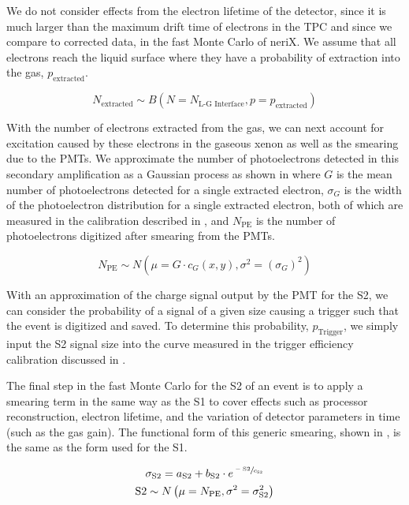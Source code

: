 We do not consider effects from the electron lifetime of the detector, since it is much larger than the maximum drift time of electrons in the TPC and since we compare to corrected data, in the fast Monte Carlo of neriX.  We assume that all electrons reach the liquid surface where they have a probability of extraction into the gas, $p_{\textrm{extracted}}$.


\begin{equation}
        \label{eqn:nerix_binomial_ee}
        N_{\textrm{extracted}} \sim B \left( N= N_{\textrm{L-G Interface}}, p=p_{\textrm{extracted}} \right)
\end{equation}


With the number of electrons extracted from the gas, we can next account for excitation caused by these electrons in the gaseous xenon as well as the smearing due to the PMTs.  We approximate the number of photoelectrons detected in this secondary amplification as a Gaussian process as shown in  where $G$ is the mean number of photoelectrons detected for a single extracted electron, $\sigma_G$ is the width of the photoelectron distribution for a single extracted electron, both of which are measured in the calibration described in , and $N_{\textrm{PE}}$ is the number of photoelectrons digitized after smearing from the PMTs.

\begin{equation}
        \label{eqn:nerix_gas_gain}
        N_{\textrm{PE}} \sim N(\mu=G \cdot c_{G}(x, y), \sigma^2=(\sigma_G)^2)
\end{equation}


With an approximation of the charge signal output by the PMT for the S2, we can consider the probability of a signal of a given size causing a trigger such that the event is digitized and saved.  To determine this probability, $p_{\textrm{Trigger}}$, we simply input the S2 signal size into the curve measured in the trigger efficiency calibration discussed in .

The final step in the fast Monte Carlo for the S2 of an event is to apply a smearing term in the same way as the S1 to cover effects such as processor reconstruction, electron lifetime, and the variation of detector parameters in time (such as the gas gain).  The functional form of this generic smearing, shown in , is the same as the form used for the S1.


\begin{equation}
        \label{eqn:nerix_s2_smearing}
        \begin{gathered}
                \sigma_{\textrm{S2}} = a_{\textrm{S2}} + b_{\textrm{S2}} \cdot e^{\sfrac{-\textrm{S2}}{c_{\textrm{S2}}}} \\
                \textrm{S2} \sim N \left( \mu = N_{\textrm{PE}}, \sigma^2  = \sigma_{\textrm{S2}}^2 \right)
        \end{gathered}
\end{equation}



